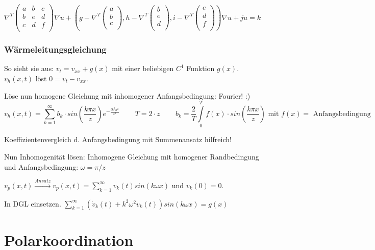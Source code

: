 \documentclass[10pt,a4paper]{article}
\begin{document}
$\nabla^T
\begin{pmatrix}
a & b&c \\
b & e&d \\
c&d&f\\
\end{pmatrix}
\nabla u+\left(g - \nabla^T \begin{pmatrix}
a\\b\\c\\
\end{pmatrix}, h - \nabla^T \begin{pmatrix}
b\\e\\d\\
\end{pmatrix},i - \nabla^T \begin{pmatrix}
e\\d\\f\\
\end{pmatrix}\right)\nabla u + ju = k$

\subsubsection{Wärmeleitungsgleichung}
So sieht sie aus: $v_t = v_{xx} + g(x)$ mit einer beliebigen $C^1$ Funktion $g(x)$. $v_h(x,t)$ löst $0 = v_t - v_{xx}$.

Löse nun homogene Gleichung mit inhomogener Anfangsbedingung: Fourier! :)
\[v_h(x,t) = \sum\limits_{k=1}^{\infty} b_k \cdot sin\left(\frac{k \pi x}{z} \right) e^{-\frac{t k^2 \pi^2}{z^2}}
\,\,\,\,\,\,\,\,\,\,\,\,\,
T=2\cdot z
\,\,\,\,\,\,\,\,\,\,\,\,\,
b_k = \frac{2}{T} \int\limits_0^T f(x) \cdot sin\left( \frac{k \pi x}{z}\right) \mbox{ mit } f(x) = \mbox{ Anfangsbedingung}
\]

Koeffizientenvergleich d. Anfangsbedingung mit Summenansatz hilfreich!

Nun Inhomogenität lösen: Inhomogene Gleichung mit homogener Randbedingung und Anfangsbedingung: $\omega = \pi / z$

$v_p(x,t) \xrightarrow{Ansatz} v_p(x,t) = \sum\limits_{k=1}^{\infty} v_k(t) sin \left( k \omega x \right)$ und $v_k(0) = 0$.

In DGL einsetzen. $\sum\limits_{k=1}^{\infty} \left(\dot{v}_k(t) + k^2 \omega^2 v_k(t) \right) sin(k \omega x) = g(x)$
\pagebreak
\section{Polarkoordination}
\end{document}
